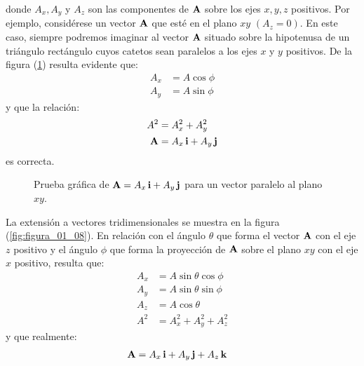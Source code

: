 donde $A_{x}, A_{y}$ y $A_{z}$ son las componentes de $\vb{A}$ sobre los ejes $x, y, z$ positivos. Por ejemplo, considérese un vector $\vb{A}$ que esté en el plano $x y$ $(A_{z} = 0)$. En este caso, siempre podremos imaginar al vector $\vb{A}$ situado sobre la hipotenusa de un triángulo rectángulo cuyos catetos sean paralelos a los ejes $x$ y $y$ positivos. De la figura (\ref{fig:figura_01_07}) resulta evidente que:
\begin{align}
    A_{x} &= A \cos \phi \label{eq:ecuacion_01_08} \\
    A_{y} &= A \sin \phi \label{eq:ecuacion_01_09}
\end{align}
y que la relación:
\begin{align}
    A^{2} &= A_{x}^{2} + A_{y}^{2} \label{eq:ecuacion_01_10} \\
    \vb{A} &= A_{x} \, \vb{i} + A_{y} \, \vb{j} \label{eq:ecuacion_01_11}
\end{align}
es correcta.
\begin{figure}[H]
    \centering
    \caption{Prueba gráfica de $\vb{A} = A_{x} \, \vb{i} + A_{y} \, \vb{j}$ para un vector paralelo al plano $x y$.}
    \label{fig:figura_01_07}
\end{figure}
La extensión a vectores tridimensionales se muestra en la figura (\ref{fig:figura_01_08}). En relación con el ángulo $\theta$ que forma el vector $\vb{A}$ con el eje $z$ positivo y el ángulo $\phi$ que forma la proyección de $\vb{A}$ sobre el plano $x y$ con el eje $x$ positivo, resulta que:
\begin{align}
    A_{x} &= A \sin \theta \cos \phi \label{eq:ecuacion_01_12} \\[0.5em]
    A_{y} &= A \sin \theta \sin \phi \label{eq:ecuacion_01_13} \\[0.5em]
    A_{z} &= A \cos \theta \label{eq:ecuacion_01_14} \\[0.5em]
    A^{2} &= A_{x}^{2} + A_{y}^{2} + A_{z}^{2} \label{eq:ecuacion_01_15}
\end{align}
y que realmente:
\begin{align*}
    \vb{A} &= A_{x} \, \vb{i} + A_{y} \, \vb{j} + A_{z} \, \vb{k}
\end{align*}
